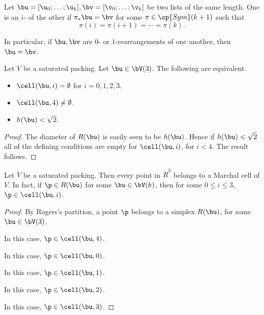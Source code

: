 \begin{definition}[$i$-rearrangement] 
Let $\bu=[\u_0;\ldots;\u_k],\bv=[\v_0;\ldots;\v_k]$ be two lists of the same length.  
One is an
 $i$- of the other if
$\pi_*\bu = \bv$ for some $\pi\in\op{Sym}(k+1)$ such
that 
\begin{displaymath} 
\pi(i) = \pi(i+1)=\cdots=\pi(k).
\end{displaymath}
\end{definition}

In particular, if $\bu,\bv$ are $0$- or $1$-rearrangements of one another,
then $\bu = \bv$.


\begin{lemma}[]\label{lemma:M-complement4} 
Let $V$ be a saturated packing.  Let $\bu\in \bV(3)$.
The following are equivalent.
\begin{itemize} 
\item  $\cell(\bu,i)=\emptyset$ for $i=0,1,2,3$.
\item  $\cell(\bu,4)\ne\emptyset$.
\item  $h(\bu)<\sqrt2$.
\end{itemize}
\end{lemma}

\begin{proof} 
The diameter of $R(\bu)$ is easily seen to be $h(\bu)$.  Hence if $h(\bu)<\sqrt2$
all of the defining conditions are empty for $\cell(\bu,i)$, for $i<4$.  The result follows.
\end{proof}

\begin{lemma}[]\label{lemma:M-exhaust} 
Let $V$ be a saturated packing.  Then every point in $\ring{R}^3$ belongs to
a Marchal cell of $V$.  In fact, if $\p\in R(\bu)$ for some $\bu\in \bV(k)$, 
then for some $0\le i\le 3$, $\p\in \cell(\bu,i)$.
\end{lemma}

\begin{proof} 
By Rogers's partition, a point $\p$ belongs to a simplex
$R(\bu)$, for some $\bu\in\bV(3)$.  

\noindent
{} In this case,  $\p\in\cell(\bu,4)$.

\noindent
{} In this case, $\p\in\cell(\bu,0)$.

\noindent
{} 
In this case, $\p\in \cell(\bu,1)$.

\noindent
{} In this
case, $\p\in \cell(\bu,2)$.

\noindent
{} In this
case, $\p\in \cell(\bu,3)$.
\end{proof}




